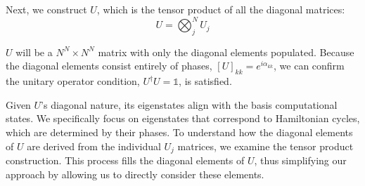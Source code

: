\documentclass[msc,oneside]{ubcthesis}
\begin{document}
	
	Next, we construct $U$, which is the tensor product of all the diagonal matrices:
	\begin{equation}\label{U-tensor}
	 U = \bigotimes_j^N U_j
	 \end{equation}
	
	
	$U$ will be a $N^N \times N^N$ matrix with only the diagonal elements populated. Because the diagonal elements consist entirely of phases, $\left[U \right]_{kk} = e^{i\alpha_{kk}} $, we can confirm the unitary operator condition, $U^\dagger U = \mathds{1}$, is satisfied.
	
	
	Given $U$'s diagonal nature, its eigenstates align with the basis computational states. We specifically focus on eigenstates that correspond to Hamiltonian cycles, which are determined by their phases. To understand how the diagonal elements of $U$ are derived from the individual $U_j$ matrices, we examine the tensor product construction. This process fills the diagonal elements of $U$, thus simplifying our approach by allowing us to directly consider these elements.
	
\end{document}
